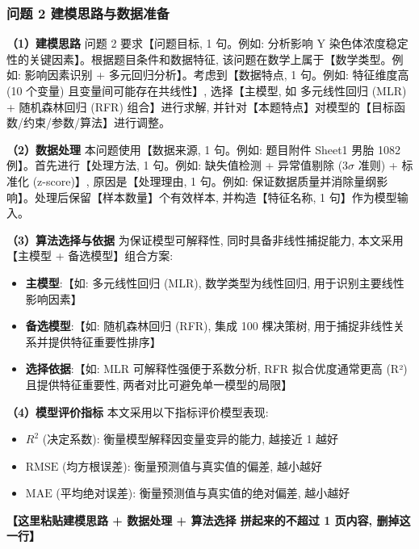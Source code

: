 
\subsubsection{问题 2 建模思路与数据准备}

\textbf{（1）建模思路} \quad 问题 2 要求【问题目标, 1 句。例如: 分析影响 Y 染色体浓度稳定性的关键因素】。根据题目条件和数据特征, 该问题在数学上属于【数学类型。例如: 影响因素识别 + 多元回归分析】。考虑到【数据特点, 1 句。例如: 特征维度高 (10 个变量) 且变量间可能存在共线性】, 选择【主模型, 如 多元线性回归 (MLR) + 随机森林回归 (RFR) 组合】进行求解, 并针对【本题特点】对模型的【目标函数/约束/参数/算法】进行调整。

\textbf{（2）数据处理} \quad 本问题使用【数据来源, 1 句。例如: 题目附件 Sheet1 男胎 1082 例】。首先进行【处理方法, 1 句。例如: 缺失值检测 + 异常值剔除 (3$\sigma$ 准则) + 标准化 (z-score)】, 原因是【处理理由, 1 句。例如: 保证数据质量并消除量纲影响】。处理后保留【样本数量】个有效样本, 并构造【特征名称, 1 句】作为模型输入。

\textbf{（3）算法选择与依据} \quad 为保证模型可解释性, 同时具备非线性捕捉能力, 本文采用【主模型 + 备选模型】组合方案:
\begin{itemize}
  \item \textbf{主模型}:【如: 多元线性回归 (MLR), 数学类型为线性回归, 用于识别主要线性影响因素】
  \item \textbf{备选模型}:【如: 随机森林回归 (RFR), 集成 100 棵决策树, 用于捕捉非线性关系并提供特征重要性排序】
  \item \textbf{选择依据}:【如: MLR 可解释性强便于系数分析, RFR 拟合优度通常更高 (R²) 且提供特征重要性, 两者对比可避免单一模型的局限】
\end{itemize}

\textbf{（4）模型评价指标} \quad 本文采用以下指标评价模型表现:
\begin{itemize}
  \item $R^2$ (决定系数): 衡量模型解释因变量变异的能力, 越接近 1 越好
  \item $\text{RMSE}$ (均方根误差): 衡量预测值与真实值的偏差, 越小越好
  \item $\text{MAE}$ (平均绝对误差): 衡量预测值与真实值的绝对偏差, 越小越好
\end{itemize}

\textbf{【这里粘贴建模思路 + 数据处理 + 算法选择 拼起来的不超过 1 页内容, 删掉这一行】}
